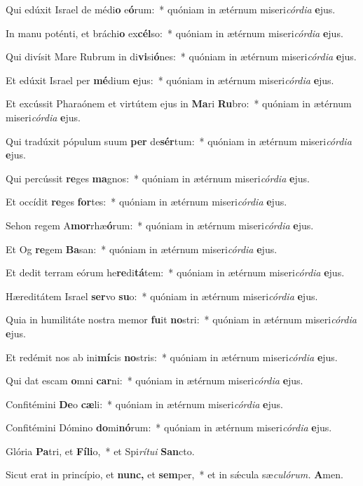 \item Qui edúxit Israel de médi\textbf{o} e\textbf{ó}rum:~* quóniam in ætérnum miseri\tinyhspace\textit{córdia} \textbf{e}jus.
\item In manu poténti, et bráchi\textbf{o} ex\textbf{cél}so:~* quóniam in ætérnum miseri\tinyhspace\textit{córdia} \textbf{e}jus.
\item Qui divísit Mare Rubrum in di\textbf{vi}si\textbf{ó}nes:~* quóniam in ætérnum miseri\tinyhspace\textit{córdia} \textbf{e}jus.
\item Et edúxit Israel per \textbf{mé}dium \textbf{e}jus:~* quóniam in ætérnum miseri\tinyhspace\textit{córdia} \textbf{e}jus.
\item Et excússit Pharaónem et virtútem ejus in \textbf{Ma}ri \textbf{Ru}bro:~* quóniam in ætérnum miseri\tinyhspace\textit{córdia} \textbf{e}jus.
\item Qui tradúxit pópulum suum \textbf{per} de\textbf{sér}tum:~* quóniam in ætérnum miseri\tinyhspace\textit{córdia} \textbf{e}jus.
\item Qui percússit \textbf{re}ges \textbf{ma}gnos:~* quóniam in ætérnum miseri\tinyhspace\textit{córdia} \textbf{e}jus.
\item Et occídit \textbf{re}ges \textbf{for}tes:~* quóniam in ætérnum miseri\tinyhspace\textit{córdia} \textbf{e}jus.
\item Sehon regem A\textbf{mor}rhæ\textbf{ó}rum:~* quóniam in ætérnum miseri\tinyhspace\textit{córdia} \textbf{e}jus.
\item Et Og \textbf{re}gem \textbf{Ba}san:~* quóniam in ætérnum miseri\tinyhspace\textit{córdia} \textbf{e}jus.
\item Et dedit terram eórum he\textbf{re}di\textbf{tá}tem:~* quóniam in ætérnum miseri\tinyhspace\textit{córdia} \textbf{e}jus.
\item Hæreditátem Israel \textbf{ser}vo \textbf{su}o:~* quóniam in ætérnum miseri\tinyhspace\textit{córdia} \textbf{e}jus.
\item Quia in humilitáte nostra memor \textbf{fu}it \textbf{no}stri:~* quóniam in ætérnum miseri\tinyhspace\textit{córdia} \textbf{e}jus.
\item Et redémit nos ab ini\textbf{mí}cis \textbf{no}stris:~* quóniam in ætérnum miseri\tinyhspace\textit{córdia} \textbf{e}jus.
\item Qui dat escam \textbf{o}mni \textbf{car}ni:~* quóniam in ætérnum miseri\tinyhspace\textit{córdia} \textbf{e}jus.
\item Confitémini \textbf{De}o \textbf{cæ}li:~* quóniam in ætérnum miseri\tinyhspace\textit{córdia} \textbf{e}jus.
\item Confitémini Dómino \textbf{do}mi\textbf{nó}rum:~* quóniam in ætérnum miseri\tinyhspace\textit{córdia} \textbf{e}jus.
\item Glória \textbf{Pa}tri, et \textbf{Fí}\textbf{li}o,~* et Spi\tinyhspace\textit{rítui} \textbf{San}cto.
\item Sicut erat in princípio, et \textbf{nunc,} et \textbf{sem}per,~* et in sǽcula sæ\tinyhspace\textit{culórum.} \textbf{A}men.